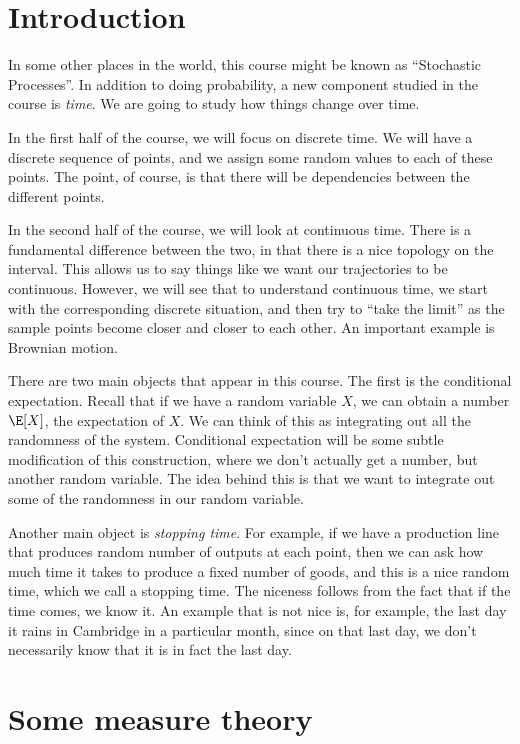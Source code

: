 \documentclass[a4paper]{article}
\begin{document}
\section{Introduction}
In some other places in the world, this course might be known as ``Stochastic Processes''. In addition to doing probability, a new component studied in the course is \emph{time}. We are going to study how things change over time.

In the first half of the course, we will focus on discrete time. We will have a discrete sequence of points, and we assign some random values to each of these points. The point, of course, is that there will be dependencies between the different points.

In the second half of the course, we will look at continuous time. There is a fundamental difference between the two, in that there is a nice topology on the interval. This allows us to say things like we want our trajectories to be continuous. However, we will see that to understand continuous time, we start with the corresponding discrete situation, and then try to ``take the limit'' as the sample points become closer and closer to each other. An important example is Brownian motion.

There are two main objects that appear in this course. The first is the conditional expectation. Recall that if we have a random variable $X$, we can obtain a number $\E[X]$, the expectation of $X$. We can think of this as integrating out all the randomness of the system. Conditional expectation will be some subtle modification of this construction, where we don't actually get a number, but another random variable. The idea behind this is that we want to integrate out some of the randomness in our random variable.

Another main object is \emph{stopping time}. For example, if we have a production line that produces random number of outputs at each point, then we can ask how much time it takes to produce a fixed number of goods, and this is a nice random time, which we call a stopping time. The niceness follows from the fact that if the time comes, we know it. An example that is not nice is, for example, the last day it rains in Cambridge in a particular month, since on that last day, we don't necessarily know that it is in fact the last day.

\section{Some measure theory}
\end{document}
